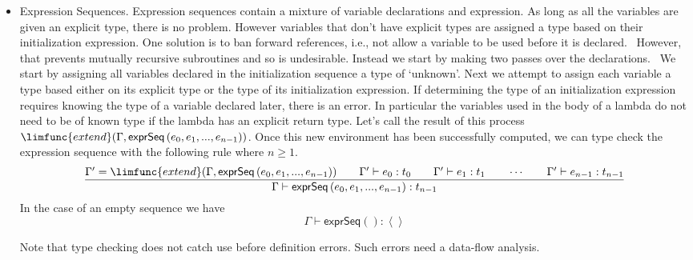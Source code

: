 \documentclass[12pt]{article}
\begin{document}
\begin{itemize}
[[Note. This rule needs to be amended to allow patterns such as tuples of
location on the left.]] [[Apart from the need to deal with tuples, an
assignment $\mathsf{assign}(x,y)$ is essentially an abbreviation for $%
\mathsf{call(dot}\left[ \mathsf{set}\right] (\mathsf{loc}(x)),y)$, so I\
should check that the type rules agrees.]]

\item Expression Sequences. Expression sequences contain a mixture of
variable declarations and expression. As long as all the variables are given
an explicit type, there is no problem. However variables that don't have
explicit types are assigned a type based on their initialization expression.
One solution is to ban forward references, i.e., not allow a variable to be
used before it is declared. \ However, that prevents mutually recursive
subroutines and so is undesirable. Instead we start by making two passes
over the declarations. \ We start by assigning all variables declared in the
initialization sequence a type of `unknown'. Next we attempt to assign each
variable a type based either on its explicit type or the type of its
initialization expression. If determining the type of an initialization
expression requires knowing the type of a variable declared later, there is
an error. In particular the variables used in the body of a lambda do not
need to be of known type if the lambda has an explicit return type. Let's
call the result of this process $\limfunc{extend}(\Gamma ,\mathsf{exprSeq}%
\left( e_{0},e_{1},...,e_{n-1}\right) )$. Once this new environment has been
successfully computed, we can type check the expression sequence with the
following rule where $n\geq 1$.%
\begin{equation*}
\frac{\Gamma ^{\prime }=\limfunc{extend}(\Gamma ,\mathsf{exprSeq}\left(
e_{0},e_{1},...,e_{n-1}\right) )\qquad \Gamma ^{\prime }\vdash
e_{0}:t_{0}\qquad \Gamma ^{\prime }\vdash e_{1}:t_{1}\qquad \cdots \qquad
\Gamma ^{\prime }\vdash e_{n-1}:t_{n-1}}{\Gamma \vdash \mathsf{exprSeq}%
\left( e_{0},e_{1},...,e_{n-1}\right) :t_{n-1}}
\end{equation*}%
In the case of an empty sequence we have%
\begin{equation*}
\Gamma \vdash \mathsf{exprSeq}\left( {}\right) :\left\langle {}\right\rangle 
\end{equation*}

Note that type checking does not catch use before definition errors. Such
errors need a data-flow analysis.


\end{itemize}
\end{document}
